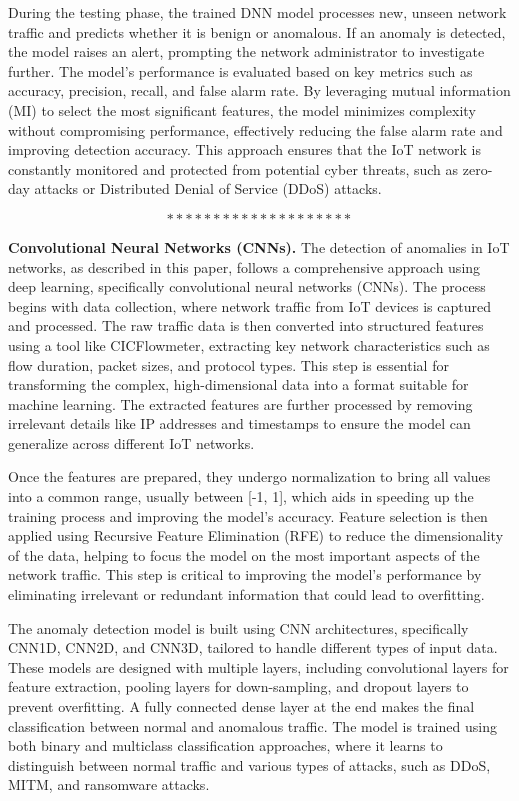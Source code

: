 During the testing phase, the trained DNN model processes new, unseen network traffic and predicts whether it is benign or anomalous. If an anomaly is detected, the model raises an alert, prompting the network administrator to investigate further. The model's performance is evaluated based on key metrics such as accuracy, precision, recall, and false alarm rate. By leveraging mutual information (MI) to select the most significant features, the model minimizes complexity without compromising performance, effectively reducing the false alarm rate and improving detection accuracy. This approach ensures that the IoT network is constantly monitored and protected from potential cyber threats, such as zero-day attacks or Distributed Denial of Service (DDoS) attacks\cite{80}.

$$********************$$

\textbf{Convolutional Neural Networks (CNNs).} The detection of anomalies in IoT networks, as described in this paper, follows a comprehensive approach using deep learning, specifically convolutional neural networks (CNNs). The process begins with data collection, where network traffic from IoT devices is captured and processed. The raw traffic data is then converted into structured features using a tool like CICFlowmeter, extracting key network characteristics such as flow duration, packet sizes, and protocol types. This step is essential for transforming the complex, high-dimensional data into a format suitable for machine learning. The extracted features are further processed by removing irrelevant details like IP addresses and timestamps to ensure the model can generalize across different IoT networks.

Once the features are prepared, they undergo normalization to bring all values into a common range, usually between [-1, 1], which aids in speeding up the training process and improving the model's accuracy. Feature selection is then applied using Recursive Feature Elimination (RFE) to reduce the dimensionality of the data, helping to focus the model on the most important aspects of the network traffic. This step is critical to improving the model's performance by eliminating irrelevant or redundant information that could lead to overfitting.

The anomaly detection model is built using CNN architectures, specifically CNN1D, CNN2D, and CNN3D, tailored to handle different types of input data. These models are designed with multiple layers, including convolutional layers for feature extraction, pooling layers for down-sampling, and dropout layers to prevent overfitting. A fully connected dense layer at the end makes the final classification between normal and anomalous traffic. The model is trained using both binary and multiclass classification approaches, where it learns to distinguish between normal traffic and various types of attacks, such as DDoS, MITM, and ransomware attacks.


